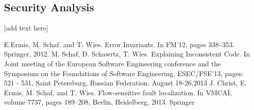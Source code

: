 \documentclass{article}
\begin{document}
\subsection{Security Analysis}
[add text here]
\newpage

\begin{thebibliography}{9}
E.Ermis, M. Schaf, and T. Wies. Error Invariants. In FM’12, pages 338–353. Springer, 2012.
M. Schaf, D. Schawrtz, T. Wies. Explaining Inconsistent Code. In Joint meeting of the European Software Engineering conference and the Symposium on the Foundations of Software Engineering, ESEC/FSE’13, pages: 521 - 531, Saint Petersburg, Russian Federation. August 18-26,2013 
J. Christ, E. Ermis, M. Schaf, and T. Wies. Flow-sensitive fault localization. In VMCAI, volume 7737, pages 189–208, Berlin, Heidelberg, 2013. Springer 
\end{thebibliography}
\end{document}
